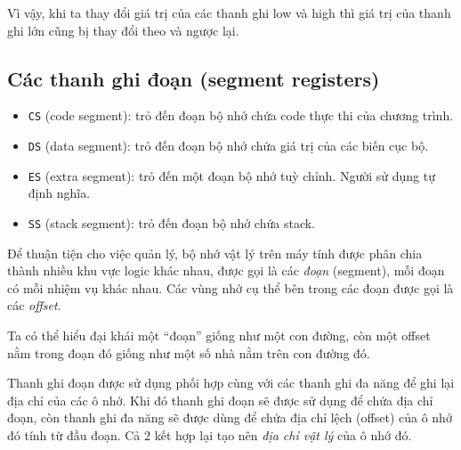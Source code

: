 \documentclass[12pt]{report}
\newcommand{\code}[1]{\texttt{#1}}
\begin{document}
Vì vậy, khi ta thay đổi giá trị của các thanh ghi low và high thì giá trị của thanh ghi lớn cũng bị thay đổi theo và ngược lại.

\subsection{Các thanh ghi đoạn (segment registers)}
\begin{itemize}
    \item \code{CS} (code segment): trỏ đến đoạn bộ nhớ chứa code thực thi của chương trình.
    \item \code{DS} (data segment): trỏ đến đoạn bộ nhớ chứa giá trị của các biến cục bộ.
    \item \code{ES} (extra segment): trỏ đến một đoạn bộ nhớ tuỳ chỉnh. Người sử dụng tự định nghĩa.
    \item \code{SS} (stack segment): trỏ đến đoạn bộ nhớ chứa stack.
\end{itemize}

Để thuận tiện cho việc quản lý, bộ nhớ vật lý trên máy tính được phân chia thành nhiều khu vực logic khác nhau, được gọi là các \textit{đoạn} (segment), mỗi đoạn có mỗi nhiệm vụ khác nhau. Các vùng nhớ cụ thể bên trong các đoạn được gọi là các \textit{offset}.

Ta có thể hiểu đại khái một ``đoạn'' giống như một con đường, còn một offset nằm trong đoạn đó giống như một số nhà nằm trên con đường đó.

Thanh ghi đoạn được sử dụng phối hợp cùng với các thanh ghi đa năng để ghi lại địa chỉ của các ô nhớ. Khi đó thanh ghi đoạn sẽ được sử dụng để chứa địa chỉ đoạn, còn thanh ghi đa năng sẽ được dùng để chứa địa chỉ lệch (offset) của ô nhớ đó tính từ đầu đoạn. Cả 2 kết hợp lại tạo nên \textit{địa chỉ vật lý} của ô nhớ đó.

\begin{figure}[H]
    \centering
\end{figure}
\end{document}

